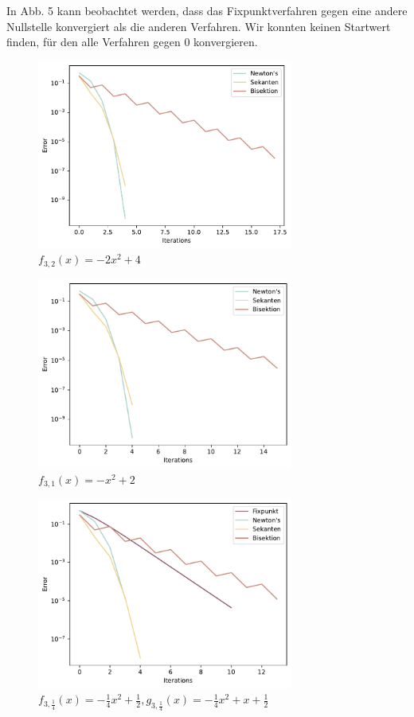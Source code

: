 \documentclass[a4paper,12pt]{article}
\newcommand{\1}{1\hspace{-0,9ex}1}
\begin{document}
In Abb. 5 kann beobachtet werden, dass das Fixpunktverfahren gegen eine andere Nullstelle konvergiert als die anderen Verfahren. Wir konnten keinen Startwert finden, für den alle Verfahren gegen $0$ konvergieren.

\begin{figure}[H]
	\centering
	\includegraphics[width=0.75\textwidth]{plots/error_series_plot(2).pdf}
	\caption{$f_{3,2}(x) = -2x^2 + 4$}
\end{figure}

\begin{figure}[H]
	\centering
	\includegraphics[width=0.75\textwidth]{plots/error_series_plot(3).pdf}
	\caption{$f_{3,1}(x) = -x^2 + 2$}
\end{figure}

\begin{figure}[H]
	\centering
	\includegraphics[width=0.75\textwidth]{plots/error_series_plot(4).pdf}
	\caption{$f_{3,\frac{1}{4}}(x) = -\frac{1}{4}x^2 +\frac{1}{2},  g_{3,\frac{1}{4}}(x)=-\frac{1}{4}x^2 + x + \frac{1}{2}$}
\end{figure}
\end{document}
